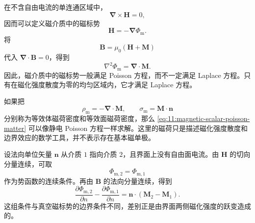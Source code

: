 在不含自由电流的单连通区域中，
\[
\bm{\nabla}\times\bm{H}=0,
\]
因而可以定义磁介质中的磁标势
\begin{equation}
	\bm{H}
	=
	-\bm{\nabla}\Phi_{\mathrm{m}}.
	\label{eq:11:h-scalar-potential}
\end{equation}
将
\[
\bm{B}
=
\mu_{0}(\bm{H}+\bm{M})
\]
代入 $\bm{\nabla}\cdot\bm{B}=0$，得到
\begin{equation}
	\nabla^{2}\Phi_{\mathrm{m}}
	=
	\bm{\nabla}\cdot\bm{M}.
	\label{eq:11:magnetic-scalar-poisson-matter}
\end{equation}
因此，磁介质中的磁标势一般满足 Poisson 方程，而不一定满足 Laplace 方程。只有在磁化强度散度为零的均匀区域内，它才满足 Laplace 方程。

如果把
\[
\rho_{\mathrm{m}}
=
-\bm{\nabla}\cdot\bm{M},
\qquad
\sigma_{\mathrm{m}}
=
\bm{M}\cdot\bm{n}
\]
分别称为等效体磁荷密度和等效面磁荷密度，那么
\eqref{eq:11:magnetic-scalar-poisson-matter} 可以像静电 Poisson 方程一样求解。这里的磁荷只是描述磁化强度散度和边界效应的数学工具，并不表示存在基本磁单极。

设法向单位矢量 $\bm{n}$ 从介质 $1$ 指向介质 $2$，且界面上没有自由面电流。由 $\bm{H}$ 的切向分量连续，可取
\[
\Phi_{\mathrm{m},2}
=
\Phi_{\mathrm{m},1}
\]
作为势函数的连续条件。再由 $\bm{B}$ 的法向分量连续，得到
\begin{equation}
	\frac{\partial\Phi_{\mathrm{m},2}}{\partial n}
	-
	\frac{\partial\Phi_{\mathrm{m},1}}{\partial n}
	=
	\bm{n}\cdot(\bm{M}_{2}-\bm{M}_{1}).
	\label{eq:11:magnetic-scalar-boundary-matter}
\end{equation}
这组条件与真空磁标势的边界条件不同，差别正是由界面两侧磁化强度的跃变造成的。

